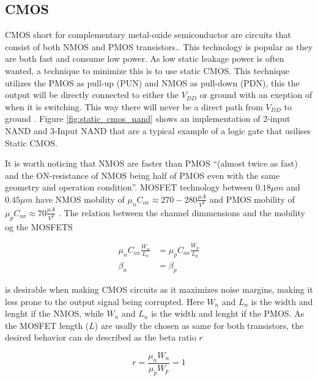 \subsection{CMOS}
CMOS short for complementary metal-oxide semiconductor are circuits that consist of both NMOS and PMOS transistors.\cite[p. 14]{carusone_2012_analog}. This technology is popular as they are both fast and consume low power. As low static leakage power is often wanted, a technique to minimize this is to use static CMOS. This technique utilizes the PMOS as pull-up (PUN) and NMOS as pull-down (PDN), this the output will be directly connected to either the $V_{DD}$ or ground with an exeption of when it is switching. This way there will never be a direct path from $V_{DD}$ to ground \cite{a2018}. Figure \ref{fig:static_cmos_nand} shows an implementation of 2-input NAND and 3-Input NAND that are a typical example of a logic gate that usilises Static CMOS.


It is worth noticing that NMOS are faster than PMOS ``(almost twice as fast) and the ON-resistance of NMOS being half of PMOS even with the same geometry and operation condition''\cite{kusumitha_2019_why}. MOSFET technology between $0.18\mu m$ and $0.45\mu m$ have NMOS mobility of $\mu_nC_{ox}\approx 270-280 \frac{\mu A}{V^2}$ and PMOS mobility of $\mu_pC_{ox}\approx 70 \frac{\mu A}{V^2}$ \cite{carusone_2012_analog}. The relation between the channel dimmensions and the mobility og the MOSFETS

\begin{align}
    \mu_nC_{ox}\frac{W_n}{L_n}&=\mu_pC_{ox}\frac{W_p}{L_p}\\
    \beta_n&=\beta_p
    \label{eq:beta_ratio}
\end{align}

is desirable when making CMOS circuits as it maximizes noise margins, making it less prone to the output signal being corrupted. Here $W_n$ and $L_n$ is the width and lenght if the NMOS, while $W_n$ and $L_n$ is the width and lenght if the PMOS. As the MOSFET length ($L$) are usally the chosen as same for both transistors, the desired behavior can de described as the beta ratio $r$ \cite[p. 90]{neilheweste_2015_cmos}

\begin{equation}
    r=\frac{\mu_n W_n}{\mu_p W_p}=1
    \label{eq:betaratio}
\end{equation}

